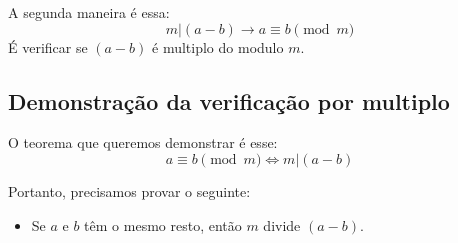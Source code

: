 \documentclass[12pt]{article}
\begin{document}
    A segunda maneira é essa:
    \begin{equation}
        m|(a-b) \to a \equiv b \pmod{m}
    \end{equation}
    É verificar se $(a-b)$ é multiplo do modulo $m$.
    \subsection{Demonstração da verificação por multiplo}
    O teorema que queremos demonstrar é esse:
    \[a \equiv b \pmod{m} \iff m|(a-b)\]

    Portanto, precisamos provar o seguinte:
    \begin{itemize}
        \item Se $a$ e $b$ têm o mesmo resto, então $m$ divide $(a-b)$.
    \end{itemize}
\end{document}
